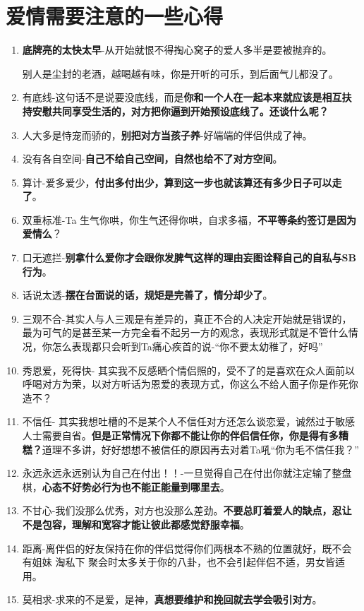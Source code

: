 \documentclass[UTF8,a4paper,8pt]{ctexart}
\begin{document}
 \section{爱情需要注意的一些心得}
 \begin{enumerate}
 	\item \textbf{底牌亮的太快太早}-从开始就恨不得掏心窝子的爱人多半是要被抛弃的。
 	
 	别人是尘封的老酒，越喝越有味，你是开听的可乐，到后面气儿都没了。
 	\item 有底线-这句话不是说要没底线，而是\textbf{你和一个人在一起本来就应该是相互扶持安慰共同享受生活的，对方把你逼到开始预设底线了。还谈什么呢？}
 	
 	\item 人大多是恃宠而骄的，\textbf{别把对方当孩子养}-好端端的伴侣供成了神。
 	
 	\item 没有各自空间-\textbf{自己不给自己空间，自然也给不了对方空间}。
 	
 	\item 算计-爱多爱少，\textbf{付出多付出少，算到这一步也就该算还有多少日子可以走了}。
 	
 	\item 双重标准-Ta 生气你哄，你生气还得你哄，自求多福，\textbf{不平等条约签订是因为爱情么}？
 	
 	\item 口无遮拦-\textbf{别拿什么爱你才会跟你发脾气这样的理由妄图诠释自己的自私与SB行为}。
 	
 	\item 话说太透-\textbf{摆在台面说的话，规矩是完善了，情分却少了}。
 	
 	\item 三观不合-其实人与人三观是有差异的，真正不合的人决定开始就是错误的，最为可气的是甚至某一方完全看不起另一方的观念，表现形式就是不管什么情况，你怎么表现都只会听到Ta痛心疾首的说-“你不要太幼稚了，好吗”
 	
 	\item 秀恩爱，死得快- 其实我不反感晒个情侣照的，受不了的是喜欢在众人面前以呼喝对方为荣，以对方听话为恩爱的表现方式，你这么不给人面子你是作死你造不？
 	
 	\item 不信任- 其实我想吐槽的不是某个人不信任对方还怎么谈恋爱，诚然过于敏感人士需要自省。\textbf{但是正常情况下你都不能让你的伴侣信任你，你是得有多糟糕？}道理不多讲，好好想想不被信任的原因再去对着Ta吼“你为毛不信任我？”
 	
 	\item 永远永远永远别认为自己在付出！！-一旦觉得自己在付出你就注定输了整盘棋，\textbf{心态不好势必行为也不能正能量到哪里去}。
 	
 	\item 不甘心-我们没那么优秀，对方也没那么差劲。\textbf{不要总盯着爱人的缺点，忍让不是包容，理解和宽容才能让彼此都感觉舒服幸福}。
 	
 	\item 距离-离伴侣的好友保持在你的伴侣觉得你们两根本不熟的位置就好，既不会有姐妹 淘私下 聚会时太多关于你的八卦，也不会引起伴侣不适，男女皆适用。
 	
 	\item 莫相求-求来的不是爱，是神，\textbf{真想要维护和挽回就去学会吸引对方}。
 \end{enumerate}
 
\end{document}
